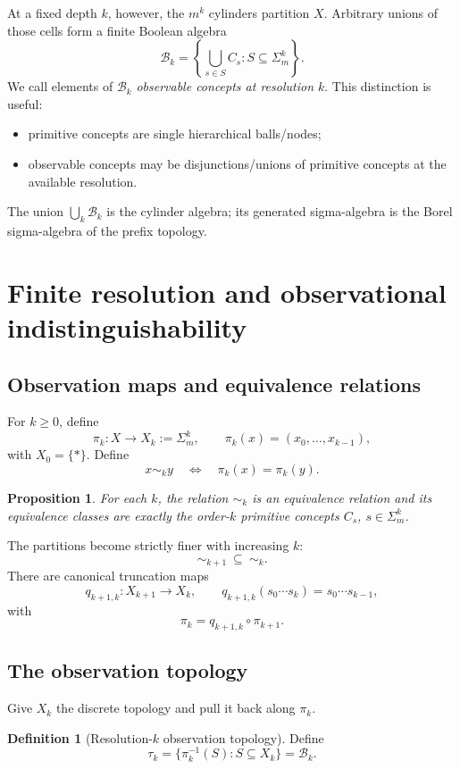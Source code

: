 \documentclass[11pt]{article}
\newtheorem{proposition}[theorem]{Proposition}
\theoremstyle{definition}
\newtheorem{definition}[theorem]{Definition}
\theoremstyle{remark}
\newcommand{\B}{\mathcal B}
\newcommand{\cyl}[1]{C_{#1}}
\begin{document}
At a fixed depth $k$, however, the $m^k$ cylinders partition $X$.  Arbitrary unions of those cells form a finite Boolean algebra
\[
\B_k=\left\{\bigcup_{s\in S}\cyl{s}:S\subseteq\Sigma_m^k\right\}.
\]
We call elements of $\B_k$ \emph{observable concepts at resolution $k$}.  This distinction is useful:
\begin{itemize}
\item primitive concepts are single hierarchical balls/nodes;
\item observable concepts may be disjunctions/unions of primitive concepts at the available resolution.
\end{itemize}
The union $\bigcup_k\B_k$ is the cylinder algebra; its generated sigma-algebra is the Borel sigma-algebra of the prefix topology.

\section{Finite resolution and observational indistinguishability}

\subsection{Observation maps and equivalence relations}

For $k\ge 0$, define
\[
\pi_k:X\longrightarrow X_k:=\Sigma_m^k,
\qquad
\pi_k(x)=(x_0,\ldots,x_{k-1}),
\]
with $X_0=\{\ast\}$.  Define
\[
x\sim_k y
\quad\Longleftrightarrow\quad
\pi_k(x)=\pi_k(y).
\]

\begin{proposition}\label{prop:fibers}
For each $k$, the relation $\sim_k$ is an equivalence relation and its equivalence classes are exactly the order-$k$ primitive concepts $\cyl{s}$, $s\in\Sigma_m^k$.
\end{proposition}

The partitions become strictly finer with increasing $k$:
\[
\sim_{k+1}\ \subseteq\ \sim_k.
\]
There are canonical truncation maps
\[
q_{k+1,k}:X_{k+1}\to X_k,
\qquad
q_{k+1,k}(s_0\cdots s_k)=s_0\cdots s_{k-1},
\]
with
\[
\pi_k=q_{k+1,k}\circ\pi_{k+1}.
\]

\subsection{The observation topology}

Give $X_k$ the discrete topology and pull it back along $\pi_k$.

\begin{definition}[Resolution-$k$ observation topology]
Define
\[
\tau_k
=\{\pi_k^{-1}(S):S\subseteq X_k\}
=\B_k.
\]
\end{definition}
\end{document}
